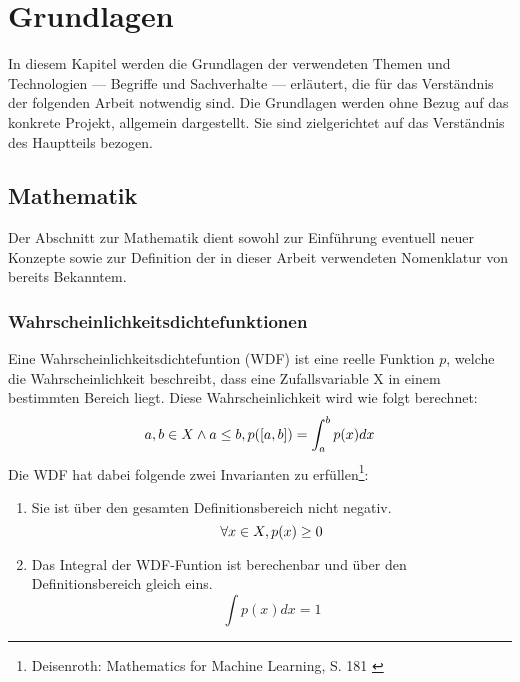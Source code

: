\chapter{Grundlagen}
\label{ch:Grundlagen}

In diesem Kapitel werden die Grundlagen der verwendeten Themen und Technologien --- Begriffe und Sachverhalte --- erläutert, die für das Verständnis der folgenden Arbeit notwendig sind.
Die Grundlagen werden ohne Bezug auf das konkrete Projekt, allgemein dargestellt. Sie sind zielgerichtet auf das Verständnis des Hauptteils bezogen.





\section{Mathematik}

Der Abschnitt zur Mathematik dient sowohl zur Einführung eventuell neuer Konzepte sowie zur Definition der in dieser Arbeit verwendeten Nomenklatur von bereits Bekanntem.

\subsection{Wahrscheinlichkeitsdichtefunktionen}
Eine Wahrscheinlichkeitsdichtefuntion (WDF) ist eine reelle Funktion $p$, welche die Wahrscheinlichkeit beschreibt, dass eine Zufallsvariable X in einem bestimmten Bereich liegt. Diese Wahrscheinlichkeit wird wie folgt berechnet:
\begin{equation}
    a,b \in X \land a \le b, \space p([a, b]) = \int_a^b p(x) dx
\end{equation}
Die WDF hat dabei folgende zwei Invarianten zu erfüllen\footnote{
    Deisenroth: Mathematics for Machine Learning, S. 181
    \cite{Deisenroth2020}
}:
\begin{enumerate}
    \item Sie ist über den gesamten Definitionsbereich nicht negativ. 
    \begin{equation}
        \forall x \in X, \space p(x) \ge 0
    \end{equation}
    \item Das Integral der WDF-Funtion ist berechenbar und über den Definitionsbereich gleich eins.
    \begin{equation}
        \int p(x) dx = 1
    \end{equation}
\end{enumerate}

